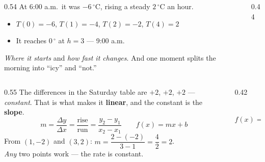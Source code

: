 \documentclass[aspectratio=169, 11pt]{beamer}
\newcommand{\lgrid}[4]{%
  \draw[step=1, linegray!45, thin] (#1,#3) grid (#2,#4);
  \draw[->, thick, charcoal] (#1,0)--(#2,0) node[below right, font=\tiny]{$x$};
  \draw[->, thick, charcoal] (0,#3)--(0,#4) node[left, font=\tiny]{$y$};}
\newcommand{\tempgrid}{%
  \draw[step=1, linegray!45, thin] (0,-8) grid (7,8);
  \draw[->, thick, charcoal] (0,0)--(7.6,0) node[right, font=\tiny]{$h$};
  \draw[->, thick, charcoal] (0,-8.6)--(0,8.8) node[above, font=\tiny]{$T$};
  \foreach \x in {1,...,7} \node[charcoal, font=\tiny, below] at (\x,0){\x};
  \foreach \y in {-8,-4,4,8} \node[charcoal, font=\tiny, left] at (0,\y){\y};}
\begin{document}
\begin{frame}[t, plain]
  \begin{columns}[T]
    \begin{column}{0.54\textwidth}
      At 6:00 a.m.\ it was $-6\,^\circ$C, rising a steady $2\,^\circ$C an hour.
      \begin{itemize}\setlength{\itemsep}{4pt}
        \item $T(0)=-6$, \; $T(1)=-4$, \; $T(2)=-2$, \; $T(4)=2$
        \item It reaches $0\,^\circ$ at $h=3$ --- 9:00 a.m.
      \end{itemize}
      \vspace{3pt}
      \emph{Where it starts} and \emph{how fast it changes}. And one moment splits the morning into
      ``icy'' and ``not.''
    \end{column}
    \begin{column}{0.44\textwidth}
      \centering
    \end{column}
  \end{columns}
\end{frame}

\begin{frame}[t, plain]
  \begin{columns}[T]
    \begin{column}{0.55\textwidth}
      The differences in the Saturday table are $+2$, $+2$, $+2$ --- \emph{constant}. That is what
      makes it \textbf{linear}, and the constant is the \textbf{slope}.
      \[ m=\frac{\Delta y}{\Delta x}=\frac{\text{rise}}{\text{run}}=\frac{y_2-y_1}{x_2-x_1}
         \qquad f(x)=mx+b \]
      From $(1,-2)$ and $(3,2)$: \; $m=\dfrac{2-(-2)}{3-1}=\dfrac{4}{2}=2$.
      \vspace{2pt}\\
      \emph{Any} two points work --- the rate is constant.
    \end{column}
    \begin{column}{0.42\textwidth}
      \centering
      \\[2pt]
      {\scriptsize $f(x)=2x-4$}
    \end{column}
  \end{columns}
\end{frame}
\end{document}
